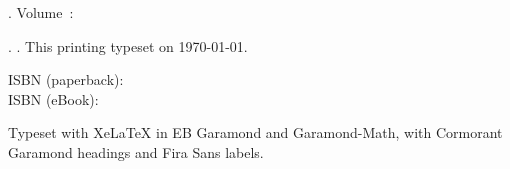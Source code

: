 {{   {\ocBook\fontsize{8.5}{11}\selectfont\color{ocBlack}\bookedition\par}}%
  \clearpage
  \thispagestyle{empty}%
  \vspace*{\fill}%
  {\footnotesize\raggedright\setlength{\parskip}{0.6em}\setlength{\parindent}{0pt}%
   \textit{\seriesname}\ifx\VOLUMETITLE\@empty\else. Volume~\VOLUMENUM: \textit{\VOLUMETITLE}\fi\par
   \bookcopyright\par
   \booklicence\par
   \bookedition. \bookpublisher. This printing typeset on \today.\par
   ISBN (paperback): \bookisbnprint\ifx\bookisbnebook\oc@empty\else\\ISBN (eBook): \bookisbnebook\fi\par
   \covercredit
   Typeset with XeLaTeX in EB Garamond and Garamond-Math, with Cormorant Garamond headings
   and Fira Sans labels.\par}%
  \clearpage
  \global\let\maketitle\relax}
\makeatother

